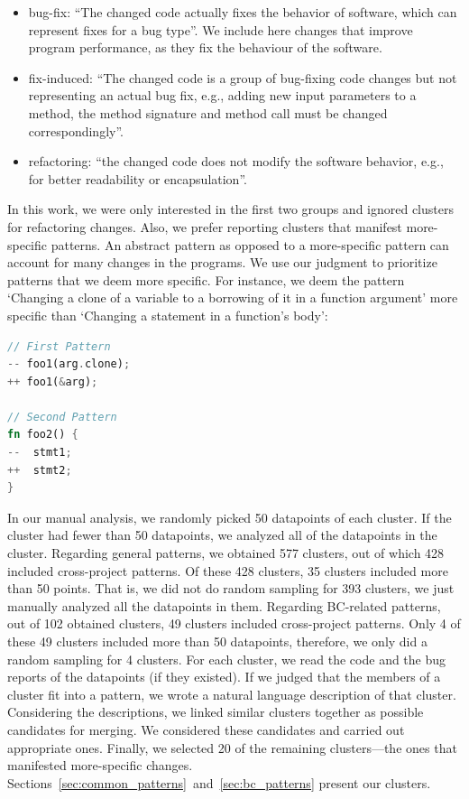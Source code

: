 \begin{itemize}
    \item bug-fix: ``The changed code actually fixes the behavior of software, which can represent fixes for a bug type''. We include here changes that improve program performance, as they fix the behaviour of the software.

    \item fix-induced: ``The changed code is a group of bug-fixing code changes but not representing an actual bug fix, e.g., adding new input parameters to a method, the method signature and method call must be changed correspondingly''.
    
    \item refactoring: ``the changed code does not modify the software behavior, e.g., for better readability or encapsulation''.
\end{itemize}

In this work, we were only interested in the first two groups and ignored clusters for refactoring changes. Also, we prefer reporting clusters that manifest more-specific patterns. An abstract pattern as opposed to a more-specific pattern can account for many changes in the programs. We use our judgment to prioritize patterns that we deem more specific. For instance, we deem the pattern `Changing a clone of a variable to a borrowing of it in a function argument' more specific than `Changing a statement in a function's body':

\begin{lstlisting}[language=Rust, style=colouredRust]
// First Pattern
-- foo1(arg.clone);
++ foo1(&arg);

// Second Pattern
fn foo2() {
--  stmt1;
++  stmt2;
}

\end{lstlisting}


In our manual analysis, we randomly picked 50 datapoints of each cluster. If the cluster had fewer than 50 datapoints, we analyzed all of the datapoints in the cluster. Regarding general patterns, we obtained 577 clusters, out of which 428 included cross-project patterns. Of these 428 clusters, 35 clusters included more than 50 points. That is, we did not do random sampling for 393 clusters, we just manually analyzed all the datapoints in them. Regarding BC-related patterns, out of 102 obtained clusters, 49 clusters included cross-project patterns. Only 4 of these 49 clusters included more than 50 datapoints, therefore, we only did a random sampling for 4 clusters. For each cluster, we read the code and the bug reports of the datapoints (if they existed). If we judged that the members of a cluster fit into a pattern, we wrote a natural language description of that cluster. Considering the descriptions, we linked similar clusters together as possible candidates for merging. We considered these candidates and carried out appropriate ones. Finally, we selected 20 of the remaining clusters---the ones that manifested more-specific changes. Sections~\ref{sec:common_patterns}~and~\ref{sec:bc_patterns} present our clusters.
